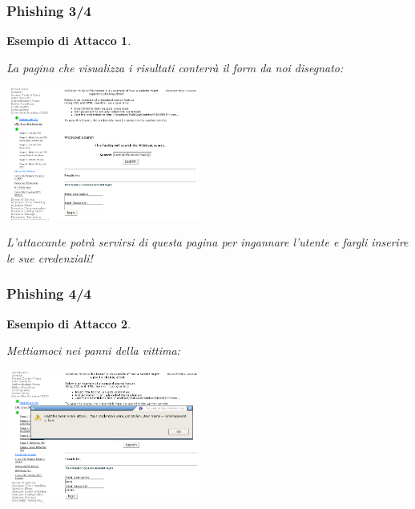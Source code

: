 \documentclass{beamer}
\newtheorem{myexample}{Esempio di Attacco}
\begin{document}
\begin{frame}
  \frametitle{Phishing 3/4}
  \begin{myexample}
    \begin{tiny}
      La pagina che visualizza i risultati conterr\`a il form da noi disegnato:
      \begin{center}
	\includegraphics[width=180pt]{images/xss_phishing_2.png}
      \end{center}
      \alert{L'attaccante potr\`a servirsi di questa pagina per ingannare l'utente e fargli inserire le sue credenziali!}
    \end{tiny}
  \end{myexample}
\end{frame}

\begin{frame}
  \frametitle{Phishing 4/4}
  \begin{myexample}
    \begin{tiny}
      Mettiamoci nei panni della vittima:
      \newline
      \begin{center}
	\includegraphics[width=180pt]{images/xss_phishing_3.png}
      \end{center}
    \end{tiny}
  \end{myexample}
\end{frame}
\end{document}
